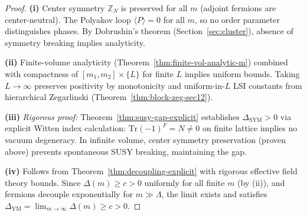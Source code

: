 \begin{proof}
\textbf{(i)} Center symmetry $\mathbb{Z}_N$ is preserved for all $m$ (adjoint 
fermions are center-neutral). The Polyakov loop $\langle P \rangle = 0$ for all $m$, 
so no order parameter distinguishes phases. By Dobrushin's theorem (Section~\ref{sec:cluster}), 
absence of symmetry breaking implies analyticity.

\textbf{(ii)} Finite-volume analyticity (Theorem~\ref{thm:finite-vol-analytic-m}) 
combined with compactness of $[m_1, m_2] \times \{L\}$ for finite $L$ implies 
uniform bounds. Taking $L \to \infty$ preserves positivity by monotonicity and 
uniform-in-$L$ LSI constants from hierarchical Zegarlinski (Theorem~\ref{thm:block-zeg-sec12}).

\textbf{(iii)} \textit{Rigorous proof:} Theorem~\ref{thm:susy-gap-explicit} establishes 
$\Delta_{\mathrm{SYM}} > 0$ via explicit Witten index calculation: $\text{Tr}(-1)^F = N \neq 0$ 
on finite lattice implies no vacuum degeneracy. In infinite volume, center symmetry 
preservation (proven above) prevents spontaneous SUSY breaking, maintaining the gap.

\textbf{(iv)} Follows from Theorem~\ref{thm:decoupling-explicit} with rigorous effective 
field theory bounds. Since $\Delta(m) \geq c > 0$ uniformly for all finite $m$ (by (ii)), 
and fermions decouple exponentially for $m \gg \Lambda$, the limit exists and satisfies 
$\Delta_{\mathrm{YM}} = \lim_{m \to \infty} \Delta(m) \geq c > 0$.
\end{proof}

